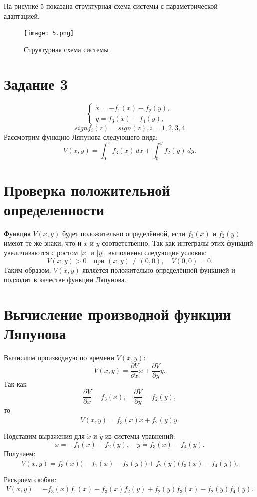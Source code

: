 \documentclass[a4paper,12pt]{extarticle} %
\begin{document}
\newpage
На рисунке 5 показана структурная схема системы с параметрической адаптацией.
\begin{figure}[H]
    \centering
    \texttt{[image: 5.png]}
    \caption{Структурная схема системы}
    \label{fig:5}
\end{figure}




\newpage
\section{Задание 3}
\[
\begin{cases}
\dot{x} = -f_1(x) - f_2(y), \\
\dot{y} = f_3(x) - f_4(y),
\end{cases}
\]
\[
sign f_i(z)=sign(z), i = 1,2,3,4
\]
Рассмотрим функцию Ляпунова следующего вида:
\[
V(x, y) = \int_{0}^{x} f_3(x)\,dx + \int_{0}^{y} f_2(y)\,dy.
\]

\section*{Проверка положительной определенности}

Функция \(V(x, y)\) будет положительно определённой, если \(f_3(x)\) и \(f_2(y)\) имеют те же знаки, что и \(x\) и \(y\) соответственно. Так как интегралы этих функций увеличиваются с ростом \(|x|\) и \(|y|\), выполнены следующие условия:
\[
V(x, y) > 0 \quad \text{при } (x, y) \neq (0, 0), \quad V(0, 0) = 0.
\]
Таким образом, \(V(x, y)\) является положительно определённой функцией и подходит в качестве функции Ляпунова.

\section*{Вычисление производной функции Ляпунова}

Вычислим производную по времени \(V(x, y)\):
\[
\dot{V}(x, y) = \frac{\partial V}{\partial x} \dot{x} + \frac{\partial V}{\partial y} \dot{y}.
\]
Так как
\[
\frac{\partial V}{\partial x} = f_3(x), \quad \frac{\partial V}{\partial y} = f_2(y),
\]
то
\[
\dot{V}(x, y) = f_3(x) \dot{x} + f_2(y) \dot{y}.
\]

Подставим выражения для \(\dot{x}\) и \(\dot{y}\) из системы уравнений:
\[
\dot{x} = -f_1(x) - f_2(y), \quad \dot{y} = f_3(x) - f_4(y).
\]
Получаем:
\[
\dot{V}(x, y) = f_3(x) \big(-f_1(x) - f_2(y)\big) + f_2(y) \big(f_3(x) - f_4(y)\big).
\]

Раскроем скобки:
\[
\dot{V}(x, y) = -f_3(x)f_1(x) - f_3(x)f_2(y) + f_2(y)f_3(x) - f_2(y)f_4(y).
\]
\end{document}
